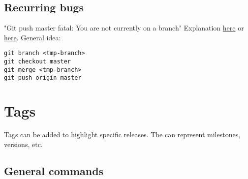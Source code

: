 \documentclass{report}
\begin{document}
\section{Recurring bugs}

"Git push master fatal: You are not currently on a branch"
Explanation \href{https://stackoverflow.com/questions/30471557/git-push-master-fatal-you-are-not-currently-on-a-branch/30471627}{here} or \href{https://stackoverflow.com/questions/4735556/git-not-currently-on-any-branch-is-there-an-easy-way-to-get-back-on-a-branch}{here}.
General idea:
\begin{verbatim}
git branch <tmp-branch>
git checkout master
git merge <tmp-branch>
git push origin master
\end{verbatim}

\chapter{Tags}
Tags can be added to highlight specific releases. The can represent milestones, versions, etc.

\section{General commands}
\end{document}
